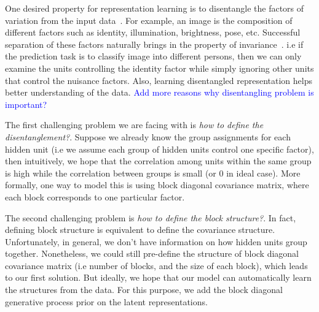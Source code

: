 One desired property for representation learning is to disentangle the factors of variation from the input data~\cite{bengio2013representation}.
For example, an image is the composition of different factors such as identity, illumination, brightness, pose, etc. Successful separation of these factors naturally brings in the property of invariance~\cite{cohen2014learning}. i.e if the prediction task is to classify image into different persons, then we can only examine the units controlling the identity factor while simply ignoring other units that control the nuisance factors. Also, learning disentangled representation helps better understanding of the data. \textcolor{blue}{Add more reasons why disentangling problem is important?}

The first challenging problem we are facing with is \textit{how to define the disentanglement?}. Suppose we already know the group assignments for each hidden unit (i.e we assume each group of hidden units control one specific factor), then intuitively, we hope that the correlation among units within the same group is high while the correlation between groups is small (or 0 in ideal case). More formally, one way to model this is using block diagonal covariance matrix, where each block corresponds to one particular factor.

The second challenging problem is \textit{how to define the block structure?}. In fact, defining block structure is equivalent to define the covariance structure. Unfortunately, in general, we don't have information on how hidden units group together. Nonetheless, we could still pre-define the structure of block diagonal covariance matrix (i.e number of blocks, and the size of each block), which leads to our first solution. But ideally, we hope that our model can automatically learn the structures from the data. For this purpose, we add the block diagonal generative process prior on the latent representations.


